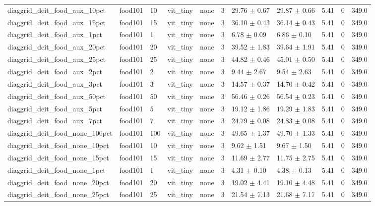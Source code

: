\begin{tabular}{lllllllllll}
diaggrid_deit_food_aux_10pct & food101 & 10 & vit_tiny & none & 3 & 29.76 $\pm$ 0.67 & 29.87 $\pm$ 0.66 & 5.41 & 0 & 349.0 \\
diaggrid_deit_food_aux_15pct & food101 & 15 & vit_tiny & none & 3 & 36.10 $\pm$ 0.43 & 36.14 $\pm$ 0.43 & 5.41 & 0 & 349.0 \\
diaggrid_deit_food_aux_1pct & food101 & 1 & vit_tiny & none & 3 & 6.78 $\pm$ 0.09 & 6.86 $\pm$ 0.10 & 5.41 & 0 & 349.0 \\
diaggrid_deit_food_aux_20pct & food101 & 20 & vit_tiny & none & 3 & 39.52 $\pm$ 1.83 & 39.64 $\pm$ 1.91 & 5.41 & 0 & 349.0 \\
diaggrid_deit_food_aux_25pct & food101 & 25 & vit_tiny & none & 3 & 44.82 $\pm$ 0.46 & 45.01 $\pm$ 0.50 & 5.41 & 0 & 349.0 \\
diaggrid_deit_food_aux_2pct & food101 & 2 & vit_tiny & none & 3 & 9.44 $\pm$ 2.67 & 9.54 $\pm$ 2.63 & 5.41 & 0 & 349.0 \\
diaggrid_deit_food_aux_3pct & food101 & 3 & vit_tiny & none & 3 & 14.57 $\pm$ 0.37 & 14.70 $\pm$ 0.42 & 5.41 & 0 & 349.0 \\
diaggrid_deit_food_aux_50pct & food101 & 50 & vit_tiny & none & 3 & 56.46 $\pm$ 0.26 & 56.54 $\pm$ 0.23 & 5.41 & 0 & 349.0 \\
diaggrid_deit_food_aux_5pct & food101 & 5 & vit_tiny & none & 3 & 19.12 $\pm$ 1.86 & 19.29 $\pm$ 1.83 & 5.41 & 0 & 349.0 \\
diaggrid_deit_food_aux_7pct & food101 & 7 & vit_tiny & none & 3 & 24.79 $\pm$ 0.08 & 24.83 $\pm$ 0.08 & 5.41 & 0 & 349.0 \\
diaggrid_deit_food_none_100pct & food101 & 100 & vit_tiny & none & 3 & 49.65 $\pm$ 1.37 & 49.70 $\pm$ 1.33 & 5.41 & 0 & 349.0 \\
diaggrid_deit_food_none_10pct & food101 & 10 & vit_tiny & none & 3 & 9.62 $\pm$ 1.51 & 9.67 $\pm$ 1.50 & 5.41 & 0 & 349.0 \\
diaggrid_deit_food_none_15pct & food101 & 15 & vit_tiny & none & 3 & 11.69 $\pm$ 2.77 & 11.75 $\pm$ 2.75 & 5.41 & 0 & 349.0 \\
diaggrid_deit_food_none_1pct & food101 & 1 & vit_tiny & none & 3 & 4.31 $\pm$ 0.10 & 4.38 $\pm$ 0.13 & 5.41 & 0 & 349.0 \\
diaggrid_deit_food_none_20pct & food101 & 20 & vit_tiny & none & 3 & 19.02 $\pm$ 4.41 & 19.10 $\pm$ 4.48 & 5.41 & 0 & 349.0 \\
diaggrid_deit_food_none_25pct & food101 & 25 & vit_tiny & none & 3 & 21.54 $\pm$ 7.13 & 21.68 $\pm$ 7.17 & 5.41 & 0 & 349.0 \\

\end{tabular}
